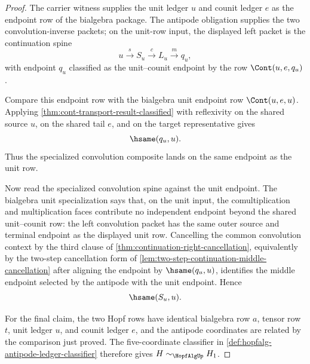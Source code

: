 \begin{proof}
The carrier witness supplies the unit ledger $u$ and counit ledger $e$ as the endpoint row of the bialgebra package. The antipode obligation supplies the two convolution-inverse packets; on the unit-row input, the displayed left packet is the continuation spine
$$
u \xrightarrow{s} S_u \xrightarrow{c} L_u \xrightarrow{m} q_u,
$$
with endpoint $q_u$ classified as the unit--counit endpoint by the row $\Cont(u,e,q_u)$.

Compare this endpoint row with the bialgebra unit endpoint row $\Cont(u,e,u)$. Applying \autoref{thm:cont-transport-result-classified} with reflexivity on the shared source $u$, on the shared tail $e$, and on the target representative gives
$$
\hsame(q_u,u).
$$
Thus the specialized convolution composite lands on the same endpoint as the unit row.

Now read the specialized convolution spine against the unit endpoint. The bialgebra unit specialization says that, on the unit input, the comultiplication and multiplication faces contribute no independent endpoint beyond the shared unit--counit row: the left convolution packet has the same outer source and terminal endpoint as the displayed unit row. Cancelling the common convolution context by the third clause of \autoref{thm:continuation-right-cancellation}, equivalently by the two-step cancellation form of \autoref{lem:two-step-continuation-middle-cancellation} after aligning the endpoint by $\hsame(q_u,u)$, identifies the middle endpoint selected by the antipode with the unit endpoint. Hence
$$
\hsame(S_u,u).
$$

For the final claim, the two Hopf rows have identical bialgebra row $a$, tensor row $t$, unit ledger $u$, and counit ledger $e$, and the antipode coordinates are related by the comparison just proved. The five-coordinate classifier in \autoref{def:hopfalg-antipode-ledger-classifier} therefore gives $H\sim_{\HopfAlgUp}H_1$.
\end{proof}
